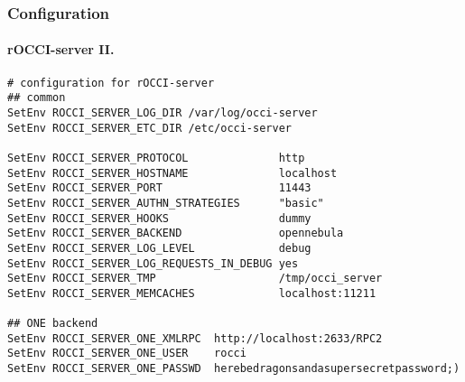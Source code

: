 \begin{frame}[fragile]
  \frametitle{Configuration}
  \framesubtitle{rOCCI-server II.}

  \begin{Sbox}
  \Fonttiny
  \begin{minipage}{\linewidth-2\fboxsep-2\fboxrule-4pt}
  \color{white}
  \begin{verbatim}
# configuration for rOCCI-server
## common
SetEnv ROCCI_SERVER_LOG_DIR /var/log/occi-server
SetEnv ROCCI_SERVER_ETC_DIR /etc/occi-server

SetEnv ROCCI_SERVER_PROTOCOL              http
SetEnv ROCCI_SERVER_HOSTNAME              localhost
SetEnv ROCCI_SERVER_PORT                  11443
SetEnv ROCCI_SERVER_AUTHN_STRATEGIES      "basic"
SetEnv ROCCI_SERVER_HOOKS                 dummy
SetEnv ROCCI_SERVER_BACKEND               opennebula
SetEnv ROCCI_SERVER_LOG_LEVEL             debug
SetEnv ROCCI_SERVER_LOG_REQUESTS_IN_DEBUG yes
SetEnv ROCCI_SERVER_TMP                   /tmp/occi_server
SetEnv ROCCI_SERVER_MEMCACHES             localhost:11211

## ONE backend
SetEnv ROCCI_SERVER_ONE_XMLRPC  http://localhost:2633/RPC2
SetEnv ROCCI_SERVER_ONE_USER    rocci
SetEnv ROCCI_SERVER_ONE_PASSWD  herebedragonsandasupersecretpassword;)
  \end{verbatim}
  \end{minipage}
  \end{Sbox}
\end{frame}
